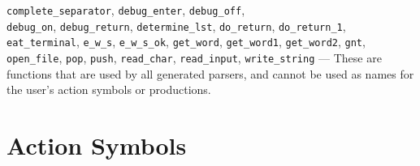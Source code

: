 \begin{itemize}
\begin{itemize}
{        \verb"complete_separator",
        \verb"debug_enter", \verb"debug_off",\\ \verb"debug_on",
        \verb"debug_return", \verb"determine_lst", \verb"do_return",
        \verb"do_return_1",\\ \verb"eat_terminal", \verb"e_w_s",
        \verb"e_w_s_ok",
        \verb"get_word", \verb"get_word1", \verb"get_word2", \verb"gnt",\\
        \verb"open_file", \verb"pop", \verb"push", \verb"read_char",
        \verb"read_input", \verb"write_string"} --- 
        These are functions that are used by all
        generated parsers, and cannot be used as names for the user's action
        symbols or productions.
     \end{itemize}
  \end{itemize}

\section{Action Symbols}\label{actions}

